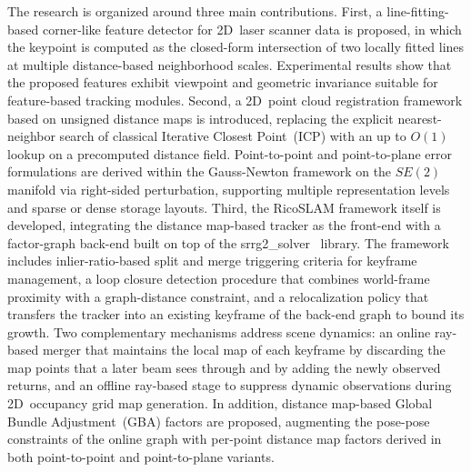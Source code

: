 The research is organized around three main contributions.
First, a line-fitting-based corner-like feature detector for 2D~laser
scanner data is proposed, in which the keypoint is computed as the
closed-form intersection of two locally fitted lines at multiple
distance-based neighborhood scales. Experimental results show that the proposed
features exhibit viewpoint and geometric invariance suitable for
feature-based tracking modules. Second, a 2D~point cloud registration
framework based on unsigned distance maps is introduced, replacing the
explicit nearest-neighbor search of classical
Iterative Closest Point~(ICP) with an up to $O(1)$ lookup on a precomputed
distance field. Point-to-point and point-to-plane error formulations are derived
within the Gauss-Newton framework on the $SE(2)$ manifold via right-sided
perturbation, supporting multiple representation levels and sparse or
dense storage layouts. Third, the RicoSLAM framework itself is
developed, integrating the distance map-based tracker as the front-end
with a factor-graph back-end built on top of the
srrg2\_solver~\cite{grisetti:robotics:2020} library. The framework
includes inlier-ratio-based split and merge triggering criteria for
keyframe management, a loop closure detection procedure that combines
world-frame proximity with a graph-distance constraint, and a
relocalization policy that transfers the tracker into an existing
keyframe of the back-end graph to bound its growth. Two complementary
mechanisms address scene dynamics: an online ray-based merger that
maintains the local map of each keyframe by discarding the map points that a
later beam sees through and by adding the newly observed returns, and an
offline ray-based stage to suppress dynamic
observations during 2D~occupancy grid map generation. In addition,
distance map-based Global Bundle Adjustment~(GBA) factors are
proposed, augmenting the pose-pose constraints of the online graph with
per-point distance map factors derived in both point-to-point and
point-to-plane variants.

